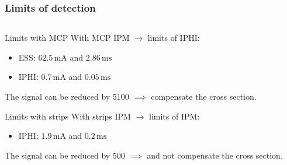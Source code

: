 \begin{frame}[t]
  \frametitle{Limits of detection}
  \begin{columns}[T]
    \begin{column}{0.45\textwidth}
      \begin{block}{Limits with MCP}
        With MCP IPM $\rightarrow$ limits of IPHI:
        \begin{itemize}
          \item ESS: $62.5\,\mathrm{mA}$ and $2.86\,\mathrm{ms}$
          \item IPHI: $0.7\,\mathrm{mA}$ and $0.05\,\mathrm{ms}$
        \end{itemize}
      \end{block}
      The signal can be reduced by 5100 $\implies$ compensate the cross section.

      \begin{block}{Limits with strips}
        With strips IPM $\rightarrow$ limits of IPM:
        \begin{itemize}
          \item IPHI: $1.9\,\mathrm{mA}$ and $0.2\,\mathrm{ms}$
        \end{itemize}
      \end{block}
      The signal can be reduced by 500 $\implies$ and not compensate the cross section.


\end{column}
\end{columns}
\end{frame}
